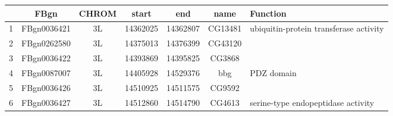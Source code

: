 \centering \begin{tabular}{c|c|c|c|c|c | p{2in}}
	&FBgn	&CHROM	&start	&end	&name & Function\\\hline
1	&FBgn0036421	&3L	&14362025	&14362807	&CG13481 & ubiquitin-protein 
transferase activity\\
2	&FBgn0262580	&3L	&14375013	&14376399	&CG43120 & \\
3	&FBgn0036422	&3L	&14393869	&14395825	&CG3868 & \\
4	&FBgn0087007	&3L	&14405928	&14529376	&bbg & PDZ domain\\
5	&FBgn0036426	&3L	&14510925	&14511575	&CG9592 & \\
6	&FBgn0036427	&3L	&14512860	&14514790	&CG4613 & serine-type 
endopeptidase activity 
\end{tabular}
